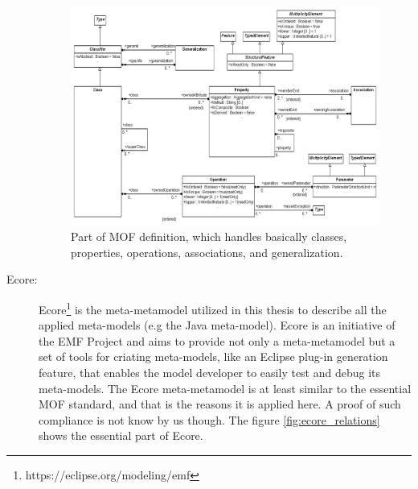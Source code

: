 \documentclass[tuberlin,cic,tc,english,noabntcite]{iiufrgs}
\begin{document}
\begin{description}
	\begin{figure}[h]
	    \caption{Part of MOF definition, which handles basically classes, properties, operations, associations, and generalization.}
	    \begin{center}
	        \includegraphics[width=35em]{emof_classes}   
	    \end{center}
	    \label{fig:emof_classes}
	\end{figure}

	\item[Ecore:] Ecore\footnote{https://eclipse.org/modeling/emf} is the meta-metamodel utilized in this thesis to describe all the applied meta-models (e.g the Java meta-model). Ecore is an initiative of the EMF Project and aims to provide not only a meta-metamodel but a set of tools for criating meta-models, like an Eclipse plug-in generation feature, that enables the model developer to easily test and debug its meta-models. The Ecore meta-metamodel is at least similar to the essential MOF standard, and that is the reasons it is applied here. A proof of such compliance is not know by us though. The figure \ref{fig:ecore_relations} shows the essential part of Ecore.


\end{description}
\end{document}
